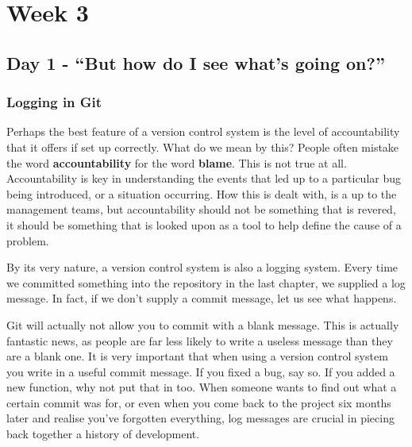 \cleardoublepage
\chapter{Week 3}
\section{Day 1 - ``But how do I see what's going on?''}
\subsection{Logging in Git}

Perhaps the best feature of a version control system is the level of accountability that it offers if set up correctly.
What do we mean by this? People often mistake the word \textbf{accountability} for the word \textbf{blame}.
This is not true at all.
Accountability is key in understanding the events that led up to a particular bug being introduced, or a situation occurring.
How this is dealt with, is a up to the management teams, but accountability should not be something that is revered, it should be something that is looked upon as a tool to help define the cause of a problem.

By its very nature, a version control system is also a logging system.
Every time we committed something into the repository in the last chapter, we supplied a log message.
In fact, if we don't supply a commit message, let us see what happens.


Git will actually not allow you to commit with a blank message.
This is actually fantastic news, as people are far less likely to write a useless message than they are a blank one.
It is very important that when using a version control system you write in a useful commit message.
If you fixed a bug, say so.
If you added a new function, why not put that in too.
When someone wants to find out what a certain commit was for, or even when you come back to the project six months later and realise you've forgotten everything, log messages are crucial in piecing back together a history of development.

